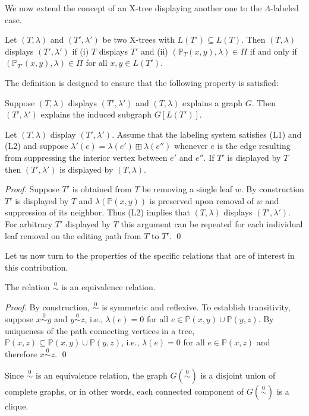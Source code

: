 \documentclass[smallextended]{svjour3}
\newcommand{\Ro}{\mathrel{\overset{0}{\sim}}}
\begin{document}
We now extend the concept of an X-tree displaying another one to the
$\Lambda$-labeled case. 
\begin{definition}
  Let $(T,\lambda)$ and $(T',\lambda')$ be two X-trees with $L(T')\subseteq
  L(T)$. Then $(T,\lambda)$ displays $(T',\lambda')$ if (i) $T$ displays
  $T'$ and (ii) $(\mathbb{P}_{T}(x,y),\lambda) \in \Pi$ if and only if
  $(\mathbb{P}_{T'}(x,y),\lambda) \in \Pi$ for all $x,y\in L(T')$.
\end{definition} 
The definition is designed to ensure that the following property is satisfied:
\begin{lemma}
  Suppose $(T,\lambda)$ displays $(T',\lambda')$ and $(T,\lambda)$ explains
  a graph $G$. Then $(T',\lambda')$ explains the induced subgraph
  $G[L(T')]$.
\end{lemma}

\begin{lemma} 
  Let $(T,\lambda)$ display $(T',\lambda')$.  Assume that the labeling
  system satisfies (L1) and (L2) and suppose
  $\lambda'(e)=\lambda(e')\boxplus\lambda(e'')$ whenever $e$ is the edge
  resulting from suppressing the interior vertex between $e'$ and $e''$.
  If $T'$ is displayed by $T$ then $(T',\lambda')$ is displayed by
  $(T,\lambda)$.
\end{lemma}
\begin{proof} 
  Suppose $T'$ is obtained from $T$ be removing a single leaf $w$. By
  construction $T'$ is displayed by $T$ and $\lambda(\mathbb{P}(x,y))$ is
  preserved upon removal of $w$ and suppression of its neighbor. Thus  
  (L2) implies that $(T,\lambda)$ displays $(T',\lambda')$. For arbitrary 
  $T'$ displayed by $T$ this argument can be repeated for each individual
  leaf removal on the editing path from $T$ to $T'$. \qed
\end{proof}

Let us now turn to the properties of the specific relations that are of
interest in this contribution.

\begin{lemma}
  The relation $\Ro$ is an equivalence relation.
\end{lemma}
\begin{proof}
  By construction, $\Ro$ is symmetric and reflexive. To establish
  transitivity, suppose $x\Ro y$ and $y\Ro z$, i.e., $\lambda(e)=0$ for all
  $e\in \mathbb{P}(x,y)\cup \mathbb{P}(y,z)$. By uniqueness of the path
  connecting vertices in a tree, $\mathbb{P}(x,z)\subseteq
  \mathbb{P}(x,y)\cup \mathbb{P}(y,z)$, i.e., $\lambda(e)=0$ for all $e\in
  \mathbb{P}(x,z)$ and therefore $x \Ro z$. \qed
\end{proof}
Since $\Ro$ is an equivalence relation, the graph $G(\Ro)$ is a disjoint
union of complete graphs, or in other words, each connected component of
$G(\Ro)$ is a clique.
\end{document}

